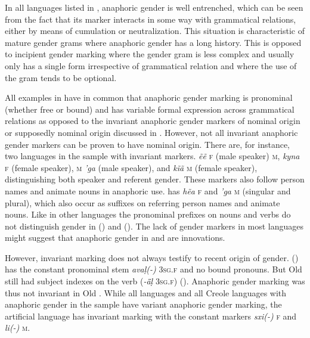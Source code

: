 \documentclass[output=collectionpaper]{langsci/langscibook}
\begin{document}
In all languages listed in , anaphoric gender is well entrenched, which can be seen from the fact that its marker interacts in some way with grammatical relations, either by means of cumulation or neutralization. This situation is characteristic of mature gender grams where anaphoric gender has a long history. This is opposed to incipient gender marking where the gender gram is less complex and usually only has a single form irrespective of grammatical relation and where the use of the gram tends to be optional.

All examples in  have in common that anaphoric gender marking is pronominal (whether free or bound) and has variable formal expression across grammatical relations as opposed to the invariant anaphoric gender markers of nominal origin or supposedly nominal origin discussed in . However, not all invariant anaphoric gender markers can be proven to have nominal origin. There are, for instance, two  languages in the sample with invariant markers.  \textit{ẽẽ} \textsc{f} (male speaker) \textsc{m}, \textit{kyna} \textsc{f} (female speaker), \textsc{m} \textit{'ga} (male speaker), and \textit{kĩã} \textsc{m} (female speaker), distinguishing both speaker and referent gender. These markers also follow person names and animate nouns in anaphoric use.  has \textit{hẽa} \textsc{f} and \textit{'ga} \textsc{m} (singular and plural), which also occur as suffixes on referring person names and animate nouns. Like in other  languages the pronominal prefixes on nouns and verbs do not distinguish gender in  (\citealt[27]{Dobson2005}) and  (\citealt[17]{Betts1981}). The lack of gender markers in most  languages might suggest that anaphoric gender in  and  are innovations.

However, invariant marking does not always testify to recent origin of gender.  () has the constant pronominal stem \textit{avaḷ(-)} \textsc{3sg.f} and no bound pronouns. But Old  still had subject indexes on the verb (\textit{-ǟḷ} \textsc{3sg.f}) (\citealt[120]{Andronov1996}). Anaphoric gender marking was thus not invariant in Old . While all  languages and all Creole languages with anaphoric gender in the sample have variant anaphoric gender marking, the artificial language  has invariant marking with the constant markers \textit{sxi(-)} \textsc{f} and \textit{li(-)} \textsc{m}.
\end{document}

